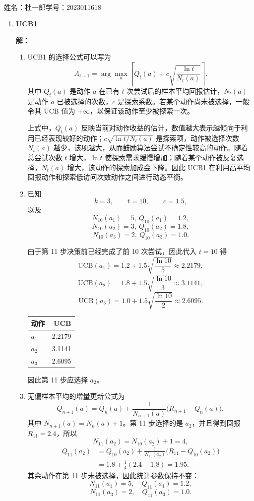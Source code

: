 \documentclass[a4paper]{article}
\makeatletter
\newcommand{\courseheader}{
        \begin{center}
            {\Large \heiti \@courseinstitute \quad \@coursename}\\[0.5em]
            {\large \@term \quad \@hwname 7 \quad \@slname}
        \end{center}
        \vspace{1em}
    }
\newcommand{\name}[1]{\noindent #1 \par\vspace{1em}}
\newenvironment{solution}{\par\noindent\textbf{解：}\par}{\par}
\makeatother
\begin{document}
\courseheader
\name{姓名：杜一郎\qquad 学号：2023011618}

\begin{enumerate}
\setlength{\itemsep}{3\parskip}

\item \textbf{UCB1}

\begin{solution}
\begin{enumerate}[label=(\arabic*)]
\item UCB1 的选择公式可以写为
\[
A_{t+1}=\arg\max_a\left[Q_t(a)+c\sqrt{\frac{\ln t}{N_t(a)}}\right].
\]
其中 $Q_t(a)$ 是动作 $a$ 在已有 $t$ 次尝试后的样本平均回报估计，$N_t(a)$ 是动作 $a$ 已被选择的次数，$c$ 是探索系数。若某个动作尚未被选择，一般令其 UCB 值为 $+\infty$，以保证该动作至少被探索一次。

上式中，$Q_t(a)$ 反映当前对动作收益的估计，数值越大表示越倾向于利用已经表现较好的动作；$c\sqrt{\ln t/N_t(a)}$ 是探索项，动作被选择次数 $N_t(a)$ 越少，该项越大，从而鼓励算法尝试不确定性较高的动作。随着总尝试次数 $t$ 增大，$\ln t$ 使探索需求缓慢增加；随着某个动作被反复选择，$N_t(a)$ 增大，该动作的探索加成会下降。因此 UCB1 在利用高平均回报动作和探索低访问次数动作之间进行动态平衡。

\item 已知
\[
k=3,\qquad t=10,\qquad c=1.5,
\]
以及
\[
N_{10}(a_1)=5,\ Q_{10}(a_1)=1.2,
\]
\[
N_{10}(a_2)=3,\ Q_{10}(a_2)=1.8,
\]
\[
N_{10}(a_3)=2,\ Q_{10}(a_3)=1.0.
\]

由于第 11 步决策前已经完成了前 10 次尝试，因此代入 $t=10$ 得
\[
\mathrm{UCB}(a_1)=1.2+1.5\sqrt{\frac{\ln 10}{5}}\approx 2.2179,
\]
\[
\mathrm{UCB}(a_2)=1.8+1.5\sqrt{\frac{\ln 10}{3}}\approx 3.1141,
\]
\[
\mathrm{UCB}(a_3)=1.0+1.5\sqrt{\frac{\ln 10}{2}}\approx 2.6095.
\]

\begin{center}
\begin{tabular}{lr}
\toprule
动作 & UCB \\
\midrule
$a_1$ & 2.2179 \\
$a_2$ & 3.1141 \\
$a_3$ & 2.6095 \\
\bottomrule
\end{tabular}
\end{center}

因此第 11 步应选择 $a_2$。

\item 无偏样本平均的增量更新公式为
\[
Q_{n+1}(a)=Q_n(a)+\frac{1}{N_{n+1}(a)}\bigl(R_{n+1}-Q_n(a)\bigr),
\]
其中 $N_{n+1}(a)=N_n(a)+1$。第 11 步选择的是 $a_2$，并且得到回报 $R_{11}=2.4$，所以
\[
N_{11}(a_2)=N_{10}(a_2)+1=4,
\]
\[
\begin{aligned}
Q_{11}(a_2)
&=Q_{10}(a_2)+\frac{1}{N_{11}(a_2)}\bigl(R_{11}-Q_{10}(a_2)\bigr)\\
&=1.8+\frac{1}{4}(2.4-1.8)=1.95.
\end{aligned}
\]
其余动作在第 11 步未被选择，因此统计参数保持不变：
\[
N_{11}(a_1)=5,\quad Q_{11}(a_1)=1.2,
\]
\[
N_{11}(a_3)=2,\quad Q_{11}(a_3)=1.0.
\]


\end{enumerate}
\end{solution}
\end{enumerate}
\end{document}
